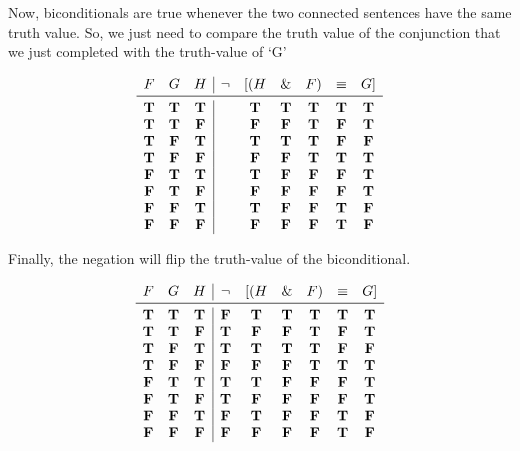 \documentclass[../logic-text.tex]{subfiles}
\begin{document}
Now, biconditionals are true whenever the two connected sentences have the same truth value.
So, we just need to compare the truth value of the conjunction that we just completed with the truth-value of \enquote*{G}

\[
  \begin{array}{ccc|cccccc}
    F & G & H & \lneg & [(H & \land & F) & \liff & G] \\ \midrule
    \true & \true & \true && \true & \true & \true & \true & \true \\
    \true & \true & \false && \false & \false & \true & \false & \true \\
    \true & \false & \true && \true & \true & \true & \false & \false \\
    \true & \false & \false && \false & \false & \true & \true & \true \\
    \false & \true & \true && \true & \false & \false & \false & \true \\
    \false & \true & \false && \false& \false & \false & \false & \true \\
    \false & \false & \true && \true & \false & \false & \true & \false \\
    \false & \false & \false && \false & \false & \false & \true & \false \\
  \end{array}
\]



Finally, the negation will flip the truth-value of the biconditional.

\[
  \begin{array}{ccc|cccccc}
    F & G & H & \lneg & [(H & \land & F) & \liff & G] \\ \midrule
    \true & \true & \true & \false & \true & \true & \true & \true & \true \\
    \true & \true & \false & \true & \false & \false & \true & \false & \true \\
    \true & \false & \true & \true & \true & \true & \true & \false & \false \\
    \true & \false & \false & \false & \false & \false & \true & \true & \true \\
    \false & \true & \true & \true & \true & \false & \false & \false & \true \\
    \false & \true & \false & \true & \false& \false & \false & \false & \true \\
    \false & \false & \true & \false & \true & \false & \false & \true & \false \\
    \false & \false & \false & \false & \false & \false & \false & \true & \false \\
  \end{array}
\]
\end{document}
